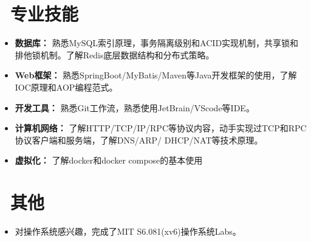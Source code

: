 \documentclass[11pt]{article}
\begin{document}
\section{\makebox[\widthof{\faGraduationCap}][c]{\color{CVBlue}\faWrench}\ 专业技能}

\begin{itemize}
    \item \textbf{数据库：} 熟悉MySQL索引原理，事务隔离级别和ACID实现机制，共享锁和排他锁机制。了解Redis底层数据结构和分布式策略。
    \item \textbf{Web框架：} 熟悉SpringBoot/MyBatis/Maven等Java开发框架的使用，了解IOC原理和AOP编程范式。
    \item \textbf{开发工具：} 熟悉Git工作流，熟悉使用JetBrain/VScode等IDE。
    \item \textbf{计算机网络：} 了解HTTP/TCP/IP/RPC等协议内容，动手实现过TCP和RPC协议客户端和服务端，了解DNS/ARP/
    DHCP/NAT等技术原理。
    \item \textbf{虚拟化：} 了解docker和docker compose的基本使用

\end{itemize}




\section{\makebox[\widthof{\faGraduationCap}][c]{\color{CVBlue}\faTags}\ 其他} 
\begin{itemize}
    \item 对操作系统感兴趣，完成了MIT S6.081(xv6)操作系统Labs。
\end{itemize}

 



\end{document}
